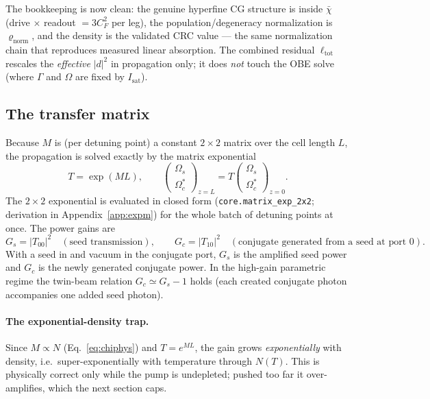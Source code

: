 \documentclass[11pt]{article}
\newcommand{\code}[1]{\texttt{#1}}
\newcommand{\rhobar}{\bar{\chi}}
\begin{document}
The bookkeeping is now clean: the genuine hyperfine CG structure is inside
$\rhobar$ (drive $\times$ readout $=3C_F^2$ per leg), the population/degeneracy
normalization is $\varrho_{\text{norm}}$, and the density is the validated CRC
value --- the same normalization chain that reproduces measured linear
absorption. The combined residual $\ell_{\text{tot}}$ rescales the
\emph{effective} $|d|^2$ in propagation only; it does \emph{not} touch the OBE
solve (where $\Gamma$ and $\Omega$ are fixed by $I_{\text{sat}}$).

\subsection{The transfer matrix}

Because $M$ is (per detuning point) a constant $2\times2$ matrix over the cell
length $L$, the propagation is solved exactly by the matrix exponential
\begin{equation}
T=\exp(M L),\qquad
\begin{pmatrix}\Omega_s\\\Omega_c^{*}\end{pmatrix}_{\!\!z=L}
=T\begin{pmatrix}\Omega_s\\\Omega_c^{*}\end{pmatrix}_{\!\!z=0}.
\end{equation}
The $2\times2$ exponential is evaluated in closed form
(\code{core.matrix\_exp\_2x2}; derivation in Appendix~\ref{app:expm}) for the whole
batch of detuning points at once. The power gains are
\begin{equation}
G_s=|T_{00}|^2 \quad(\text{seed transmission}),
\qquad
G_c=|T_{10}|^2 \quad(\text{conjugate generated from a seed at port 0}).
\label{eq:gains}
\end{equation}
With a seed in and vacuum in the conjugate port, $G_s$ is the amplified seed power
and $G_c$ is the newly generated conjugate power. In the high-gain parametric
regime the twin-beam relation $G_c\simeq G_s-1$ holds (each created conjugate
photon accompanies one added seed photon).

\paragraph{The exponential-density trap.} Since $M\propto N$ (Eq.~\eqref{eq:chiphys})
and $T=e^{ML}$, the gain grows \emph{exponentially} with density, i.e.\
super-exponentially with temperature through $N(T)$. This is physically correct
only while the pump is undepleted; pushed too far it over-amplifies, which the next
section caps.
\end{document}
